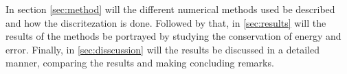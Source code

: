 In section \ref{sec:method} will the different numerical methods used be described and how the discritezation is done. Followed by that, in \ref{sec:results} will the results of the methods be portrayed by studying the conservation of energy and error. Finally, in \ref{sec:disscussion} will the results be discussed in a detailed manner, comparing the results and making concluding remarks. 




